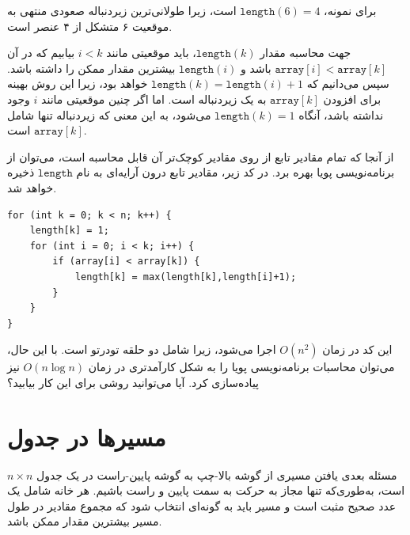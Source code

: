 برای نمونه، $\texttt{length}(6)=4$ است، زیرا طولانی‌ترین زیردنباله صعودی منتهی به موقعیت ۶ متشکل از ۴ عنصر است.

جهت محاسبه مقدار $\texttt{length}(k)$، باید موقعیتی مانند $i<k$ بیابیم که در آن $\texttt{array}[i]<\texttt{array}[k]$ باشد و $\texttt{length}(i)$ بیشترین مقدار ممکن را داشته باشد.
سپس می‌دانیم که $\texttt{length}(k)=\texttt{length}(i)+1$ خواهد بود، زیرا این روش بهینه برای افزودن $\texttt{array}[k]$ به یک زیردنباله است.
اما اگر چنین موقعیتی مانند $i$ وجود نداشته باشد، آنگاه $\texttt{length}(k)=1$ می‌شود، به این معنی که زیردنباله تنها شامل $\texttt{array}[k]$ است.

از آنجا که تمام مقادیر تابع از روی مقادیر کوچک‌تر آن قابل محاسبه است، می‌توان از برنامه‌نویسی پویا بهره برد.
در کد زیر، مقادیر تابع درون آرایه‌ای به نام $\texttt{length}$ ذخیره خواهد شد.

\begin{lstlisting}
for (int k = 0; k < n; k++) {
    length[k] = 1;
    for (int i = 0; i < k; i++) {
        if (array[i] < array[k]) {
            length[k] = max(length[k],length[i]+1);
        }
    }
}
\end{lstlisting}

این کد در زمان $O(n^2)$ اجرا می‌شود،
زیرا شامل دو حلقه تو‌در‌تو است.
با این حال، می‌توان محاسبات برنامه‌نویسی پویا را
به شکل کارآمدتری در زمان $O(n \log n)$ نیز پیاده‌سازی کرد.
آیا می‌توانید روشی برای این کار بیابید؟

\section{مسیرها در جدول}

مسئله بعدی یافتن مسیری از گوشه بالا-چپ
به گوشه پایین-راست در یک جدول $n \times n$ است،
به‌طوری‌که تنها مجاز به حرکت به سمت پایین و راست باشیم.
هر خانه شامل یک عدد صحیح مثبت است
و مسیر باید به گونه‌ای انتخاب شود که
مجموع مقادیر در طول مسیر بیشترین مقدار ممکن باشد.

